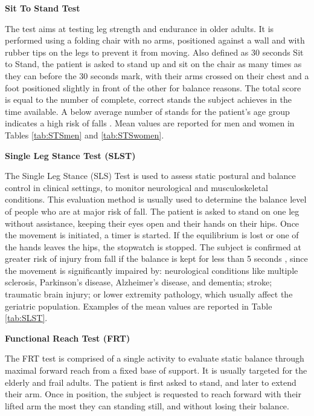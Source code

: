 \vspace{0.3cm}
\textbf{Sit To Stand Test} %

The test aims at testing leg strength and endurance in older adults. It is performed using a folding chair with no arms, positioned against a wall and with rubber tips on the legs to prevent it from moving. Also defined as 30 seconds Sit to Stand, the patient is asked to stand up and sit on the chair as many times as they can before the 30 seconds mark, with their arms crossed on their chest and a foot positioned slightly in front of the other for balance reasons. 
The total score is equal to the number of complete, correct stands the subject achieves in the time available. 
A below average number of stands for the patient’s age group indicates a high risk of falls \cite{SittoStand}. Mean values are reported for men and women in Tables \ref{tab:STSmen} and \ref{tab:STSwomen}.

\textbf{Single Leg Stance Test (SLST)}

The Single Leg Stance (SLS) Test is used to assess static postural and balance control in clinical settings, 
to monitor neurological and musculoskeletal conditions.
This evaluation method is usually used to determine the balance level of people who are at major risk of fall. 
The patient is asked to stand on one leg without assistance, keeping their eyes open and their hands on their hips. 
Once the movement is initiated, a timer is started.
If the equilibrium is lost or one of the hands leaves the hips, the stopwatch is stopped. 
The subject is confirmed at greater risk of injury from fall if the balance is kept for less than 5 seconds \cite{SingleLeg}, 
since the movement is significantly impaired by: neurological conditions like multiple sclerosis, Parkinson’s disease, 
Alzheimer’s disease, and dementia; 
stroke; traumatic brain injury; or lower extremity pathology, which usually affect the geriatric population. Examples of the mean values are reported in Table \ref{tab:SLST}. 

\textbf{Functional Reach Test (FRT)}

The FRT test is comprised of a single activity to evaluate static balance through maximal forward reach from a fixed base of support. It is usually targeted for the elderly and frail adults.
The patient is first asked to stand, and later to extend their arm. Once in position, the subject is requested to reach forward with their lifted arm the most they can standing still, and without losing their balance. 


